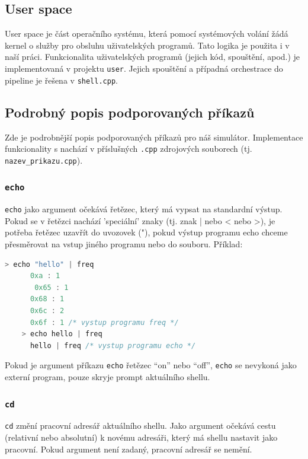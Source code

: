 \documentclass[12pt, a4paper]{article}
\begin{document}
	\subsection{User space}
	User space je část operačního systému, která pomocí systémových volání žádá kernel o služby pro obsluhu uživatelských programů. Tato logika je použita i v naší práci. Funkcionalita uživatelských programů (jejich kód, spouštění, apod.) je implementovaná v projektu \texttt{user}. Jejich spouštění a případná orchestrace do pipeline je řešena v \texttt{shell.cpp}.
	
	
	\subsection{Podrobný popis podporovaných příkazů} \label{subDetail}
	Zde je podrobnější popis podporovaných příkazů pro náš simulátor. Implementace funkcionality s nachází v příslušných \texttt{.cpp} zdrojových souborech (tj. \texttt{nazev_prikazu.cpp}).    
    
    \subsubsection*{\texttt{echo}}
    \texttt{echo} jako argument očekává řetězec, který má vypsat na standardní výstup. Pokud se v řetězci nachází 'speciální' znaky (tj. znak | nebo < nebo >), je potřeba řetězec uzavřít do uvozovek ("{}), pokud výstup programu echo chceme přesměrovat na vstup jiného programu nebo do souboru.
    Příklad:
    \begin{lstlisting}[language=C, caption={Ukázka chování programu echo},captionpos=b]
    > echo "hello" | freq
      0xa : 1
	   0x65 : 1
      0x68 : 1
      0x6c : 2
      0x6f : 1 /* vystup programu freq */
    > echo hello | freq
      hello | freq /* vystup programu echo */
    \end{lstlisting}
    
    Pokud je argument příkazu \texttt{echo} řetězec ``on'' nebo ``off'', \texttt{echo} se nevykoná jako externí program, pouze skryje prompt aktuálního shellu.
    
    \subsubsection*{\texttt{cd}}
    \texttt{cd} změní pracovní adresář aktuálního shellu. Jako argument očekává cestu (relativní nebo absolutní) k novému adresáři, který má shellu nastavit jako pracovní. Pokud argument není zadaný, pracovní adresář se nemění.
    
\end{document}
